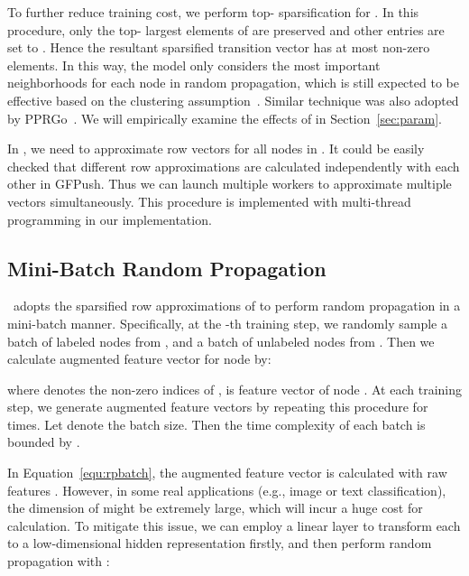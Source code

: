  To further reduce training cost, we perform top- sparsification for . In this procedure, only the top- largest elements of  are preserved and other entries are set to .
Hence the resultant sparsified transition vector  has at most  non-zero elements. 
In this way, the model only considers the  most important neighborhoods for each node in random propagation, which is still expected to be effective based on the clustering assumption~\cite{chapelle2009semi}.
Similar technique was also adopted by PPRGo~\cite{bojchevski2020scaling}.
We will empirically examine the effects of  in Section~\ref{sec:param}.

 In \model, we need to approximate row vectors for all nodes in . It could be easily checked that different row approximations are calculated independently with each other in GFPush. Thus we can launch multiple workers to approximate multiple vectors simultaneously. This procedure is implemented with multi-thread programming in our implementation. 











\subsection{Mini-Batch Random Propagation}
\label{sec:rand_prop}
\model\ adopts the sparsified row approximations of  to perform random propagation in a mini-batch manner. 
Specifically, at the -th training step, we randomly sample a batch of labeled nodes  from , and a batch of unlabeled nodes  from . Then we calculate augmented feature vector  for node  by:

where  denotes the non-zero indices of ,  is feature vector of node . At each training step, we generate  augmented feature vectors  by repeating this procedure for  times. Let  denote the batch size. Then the time complexity of each batch is bounded by .

 In Equation~\ref{equ:rpbatch}, the augmented feature vector  is calculated with raw features . However, in some real applications (e.g., image or text classification), the dimension of  might be extremely large, which will incur a huge cost for calculation.
To mitigate this issue, we can employ a linear layer to transform each  to a low-dimensional hidden representation  firstly, and then perform random propagation with :

